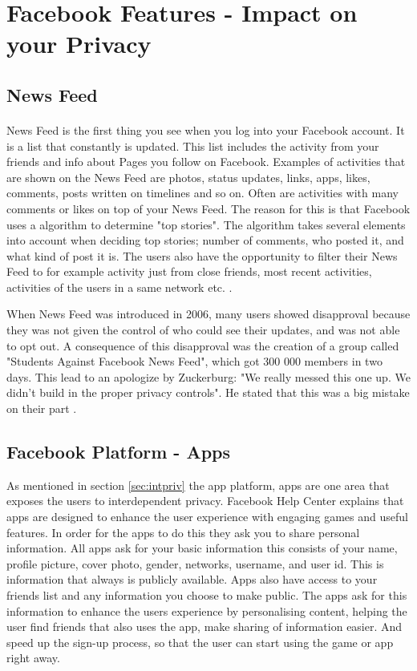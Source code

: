 \section{Facebook Features - Impact on your Privacy}\label{sec:facebook_features}

\subsection{News Feed}
\paragraph{}
News Feed is the first thing you see when you log into your Facebook account. It is a list that constantly is updated. This list includes the activity from your friends and info about Pages you follow on Facebook. Examples of activities that are shown on the News Feed are photos, status updates, links, apps, likes, comments, posts written on timelines and so on. Often are activities with many comments or likes on top of your News Feed. The reason for this is that Facebook uses a algorithm to determine "top stories". The algorithm takes several elements into account when deciding top stories; number of comments, who posted it, and what kind of post it is. The users also have the opportunity to filter their News Feed to for example activity just from close friends, most recent activities, activities of the users in a same network etc. \cite{newsfeed}.

When News Feed was introduced in 2006, many users showed disapproval because they was not given the control of who could see their updates, and was not able to opt out. A consequence of this disapproval was the creation of a group called "Students Against Facebook News Feed", which got 300 000 members in two days. This lead to an apologize by Zuckerburg: "We really messed this one up. We didn't build in the proper privacy controls". He stated that this was a big mistake on their part \cite{newsfeed2}. 


\subsection{Facebook Platform - Apps}
\label{subsec:app}
As mentioned in section \ref{sec:intpriv} the app platform, apps are one area that exposes the users to interdependent privacy. Facebook Help Center \cite{faceHelp} explains that apps are designed to enhance the user experience with engaging games and useful features. In order for the apps to do this they ask you to share personal information. All apps ask for your basic information this consists of your name, profile picture, cover photo, gender, networks, username, and user id. This is information that always is publicly available. Apps also have access to your friends list and any information you choose to make public. The apps ask for this information to enhance the users experience by personalising content, helping the user find friends that also uses the app, make sharing of information easier. And speed up the sign-up process, so that the user can start using the game or app right away. 

